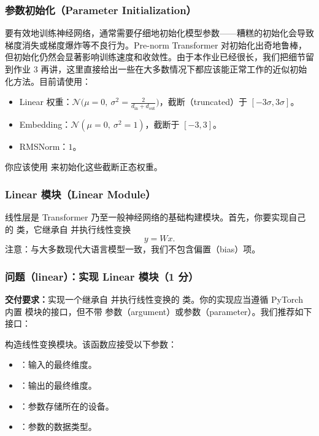 \subsubsection{参数初始化（Parameter Initialization）}

要有效地训练神经网络，通常需要仔细地初始化模型参数——糟糕的初始化会导致梯度消失或梯度爆炸等不良行为。Pre-norm Transformer 对初始化出奇地鲁棒，但初始化仍然会显著影响训练速度和收敛性。由于本作业已经很长，我们把细节留到作业 3 再讲，这里直接给出一些在大多数情况下都应该能正常工作的近似初始化方法。目前请使用：

\begin{itemize}
  \item Linear 权重：$\mathcal{N}\bigl(\mu = 0,\ \sigma^2 = \tfrac{2}{d_{\mathrm{in}} + d_{\mathrm{out}}}\bigr)$，截断（truncated）于 $[-3\sigma, 3\sigma]$。
  \item Embedding：$\mathcal{N}(\mu = 0,\ \sigma^2 = 1)$，截断于 $[-3, 3]$。
  \item RMSNorm：$1$。
\end{itemize}

你应该使用  来初始化这些截断正态权重。

\subsubsection{Linear 模块（Linear Module）}

线性层是 Transformer 乃至一般神经网络的基础构建模块。首先，你要实现自己的  类，它继承自  并执行线性变换
\begin{equation}
y = Wx.
\tag{3}
\end{equation}
注意：与大多数现代大语言模型一致，我们不包含偏置（bias）项。

\subsubsection*{问题（linear）：实现 Linear 模块（1 分）}

\textbf{交付要求：}实现一个继承自  并执行线性变换的  类。你的实现应当遵循 PyTorch 内置  模块的接口，但不带  参数（argument）或参数（parameter）。我们推荐如下接口：

\quad 构造线性变换模块。该函数应接受以下参数：
\begin{itemize}
  \item {}：输入的最终维度。
  \item {}：输出的最终维度。
  \item {}：参数存储所在的设备。
  \item {}：参数的数据类型。
\end{itemize}

